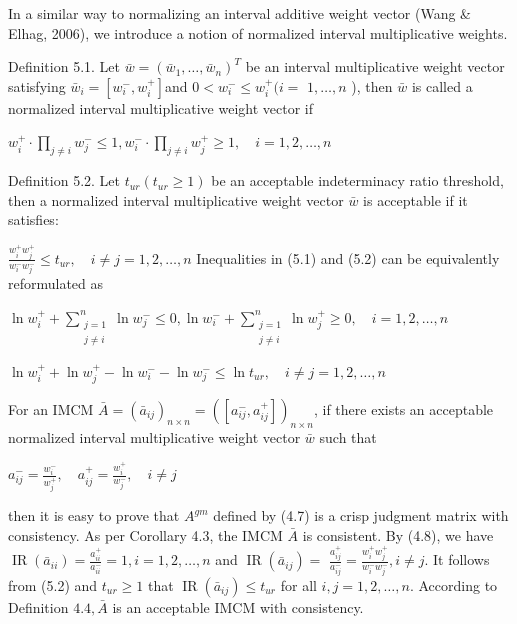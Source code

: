\documentclass[10pt]{article}
\begin{document}
In a similar way to normalizing an interval additive weight vector (Wang \& Elhag, 2006), we introduce a notion of normalized interval multiplicative weights.

Definition 5.1. Let $\bar{w}=\left(\bar{w}_{1}, \ldots, \bar{w}_{n}\right)^{T}$ be an interval multiplicative weight vector satisfying $\bar{w}_{i}=\left[w_{i}^{-}, w_{i}^{+}\right]$and $0<w_{i}^{-} \leq w_{i}^{+}(i=$ $1, \ldots, n$ ), then $\bar{w}$ is called a normalized interval multiplicative weight vector if

$w_{i}^{+} \cdot \prod_{j \neq i} w_{j}^{-} \leq 1, w_{i}^{-} \cdot \prod_{j \neq i} w_{j}^{+} \geq 1, \quad i=1,2, \ldots, n$

Definition 5.2. Let $t_{u r}\left(t_{u r} \geq 1\right)$ be an acceptable indeterminacy ratio threshold, then a normalized interval multiplicative weight vector $\bar{w}$ is acceptable if it satisfies:

$\frac{w_{i}^{+} w_{j}^{+}}{w_{i}^{-} w_{j}^{-}} \leq t_{u r}, \quad i \neq j=1,2, \ldots, n$
Inequalities in (5.1) and (5.2) can be equivalently reformulated as

$\ln w_{i}^{+}+\sum_{\substack{j=1 \\ j \neq i}}^{n} \ln w_{j}^{-} \leq 0, \ln w_{i}^{-}+\sum_{\substack{j=1 \\ j \neq i}}^{n} \ln w_{j}^{+} \geq 0, \quad i=1,2, \ldots, n$

$\ln w_{i}^{+}+\ln w_{j}^{+}-\ln w_{i}^{-}-\ln w_{j}^{-} \leq \ln t_{u r}, \quad i \neq j=1,2, \ldots, n$

For an IMCM $\bar{A}=\left(\bar{a}_{i j}\right)_{n \times n}=\left(\left[a_{i j}^{-}, a_{i j}^{+}\right]\right)_{n \times n}$, if there exists an acceptable normalized interval multiplicative weight vector $\bar{w}$ such that

$a_{i j}^{-}=\frac{w_{i}^{-}}{w_{j}^{+}}, \quad a_{i j}^{+}=\frac{w_{i}^{+}}{w_{j}^{-}}, \quad i \neq j$

then it is easy to prove that $A^{g m}$ defined by (4.7) is a crisp judgment matrix with consistency. As per Corollary 4.3, the IMCM $\bar{A}$ is consistent. By (4.8), we have $\operatorname{IR}\left(\bar{a}_{i i}\right)=\frac{a_{i i}^{+}}{a_{i i}^{-}}=1, i=1,2, \ldots, n$ and $\operatorname{IR}\left(\bar{a}_{i j}\right)=$ $\frac{a_{i j}^{+}}{a_{i j}^{-}}=\frac{w_{i}^{+} w_{j}^{+}}{w_{i}^{-} w_{j}^{-}}, i \neq j$. It follows from (5.2) and $t_{u r} \geq 1$ that $\operatorname{IR}\left(\bar{a}_{i j}\right) \leq t_{u r}$ for all $i, j=1,2, \ldots, n$. According to Definition $4.4, \bar{A}$ is an acceptable IMCM with consistency.
\end{document}
